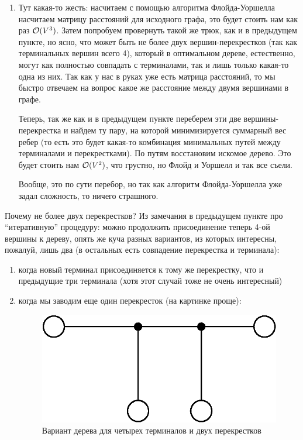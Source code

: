 \begin{solution}
\begin{enumerate}
        \item Тут какая-то жесть: насчитаем с помощью алгоритма Флойда-Уоршелла насчитаем матрицу расстояний для исходного графа, это будет стоить нам как раз $\mathcal{O}(V^3)$.
        Затем попробуем провернуть такой же трюк, как и в предыдущем пункте, но ясно, что может быть не более двух вершин-перекрестков (так как терминальных вершин всего 4), который в оптимальном дереве, естественно, могут как полностью совпадать с терминалами, так и лишь только какая-то одна из них.
        Так как у нас в руках уже есть матрица расстояний, то мы быстро отвечаем на вопрос какое же расстояние между двумя вершинами в графе.
        
        Теперь, так же как и в предыдущем пункте переберем эти две вершины-перекрестка и найдем ту пару, на которой минимизируется суммарный вес ребер (то есть это будет какая-то комбинация минимальных путей между терминалами и перекрестками). По путям восстановим искомое дерево. Это будет стоить нам $\mathcal{O}(V^2)$, что грустно, но Флойд и Уоршелл и так все съели.

        \begin{remark}
            Вообще, это по сути перебор, но так как алгоритм Флойда-Уоршелла уже задал сложность, то ничего страшного.
        \end{remark}
    \end{enumerate}

    \begin{upd}
        Почему не более двух перекрестков? Из замечания в предыдущем пункте про ``итеративную'' процедуру: можно продолжить присоединение теперь 4-ой вершины к дереву, опять же куча разных вариантов, из которых интересны, пожалуй, лишь два (в остальных есть совпадение перекрестка и терминала):
        \begin{enumerate}[1.]
            \item когда новый терминал присоединяется к тому же перекрестку, что и предыдущие три терминала (хотя этот случай тоже не очень интересный)
            \item когда мы заводим еще один перекресток (на картинке проще):
            \begin{figure}[H]
                \centering
                \includegraphics[]{pics/1b.eps}
                \caption{Вариант дерева для четырех терминалов и двух перекрестков}
            \end{figure}
        \end{enumerate}
        

\end{upd}
\end{solution}
